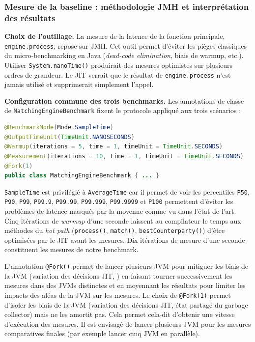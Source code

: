 \subsubsection{Mesure de la baseline : méthodologie JMH et interprétation des résultats}

\textbf{Choix de l'outillage.} La mesure de la latence de la fonction principale, \texttt{engine.process}, repose sur JMH. Cet outil permet d'éviter les pièges classiques du micro-benchmarking en Java (\textit{dead-code elimination}, biais de warmup, etc.). Utiliser \texttt{System.nanoTime()} produirait des mesures optimistes sur plusieurs ordres de grandeur. Le JIT verrait que le résultat de \texttt{engine.process} n'est jamais utilisé et supprimerait simplement l'appel.

\textbf{Configuration commune des trois benchmarks.} Les annotations de classe de \texttt{MatchingEngineBenchmark} fixent le protocole appliqué aux trois scénarios :

\begin{lstlisting}[language=Java, caption={Configuration JMH du benchmark de la baseline}]
@BenchmarkMode(Mode.SampleTime)
@OutputTimeUnit(TimeUnit.NANOSECONDS)
@Warmup(iterations = 5, time = 1, timeUnit = TimeUnit.SECONDS)
@Measurement(iterations = 10, time = 1, timeUnit = TimeUnit.SECONDS)
@Fork(1)
public class MatchingEngineBenchmark { ... }
\end{lstlisting}

\texttt{SampleTime} est privilégié à \texttt{AverageTime} car il permet de voir les percentiles \texttt{P50}, \texttt{P90}, \texttt{P99}, \texttt{P99.9}, \texttt{P99.99}, \texttt{P99.999}, \texttt{P99.9999} et \texttt{P100} permettent d'éviter les problèmes de latence masqués par la moyenne comme vu dans l'état de l'art. Cinq itérations de \textit{warmup} d'une seconde laissent au compilateur le temps aux méthodes du \textit{hot path} (\texttt{process()}, \texttt{match()}, \texttt{bestCounterparty()}) d'être optimisées par le JIT avant les mesures. Dix itérations de mesure d'une seconde constituent les mesures de notre benchmark.

L'annotation \texttt{@Fork()} permet de lancer plusieurs JVM pour mitiguer les biais de la JVM (variation des décisions JIT, ) en faisant tourner successivement les mesures dans des JVMs distinctes et en moyennant les résultats pour limiter les impacts des aléas de la JVM sur les mesures. 
Le choix de \texttt{@Fork(1)} permet d'isoler les biais de la JVM (variation des décisions JIT, état partagé du garbage collector) mais ne les amortit pas. Cela permet cela-dit d'obtenir une vitesse d'exécution des mesures. Il est envisagé de lancer plusieurs JVM pour les mesures comparatives finales (par exemple lancer cinq JVM en parallèle).

